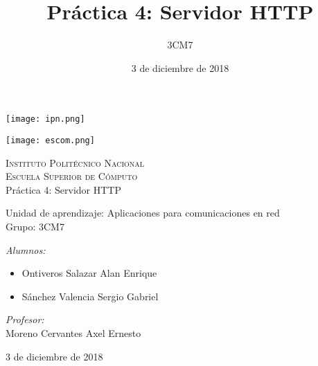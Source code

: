\documentclass[15pt]{article}
\title{Práctica 4: Servidor HTTP}
\author{3CM7}
\date{3 de diciembre de 2018}
\begin{document}
	
	\begin{titlepage}
		\begin{center}
			
			
			\noindent
			\begin{minipage}{0.5\textwidth}
				\begin{flushleft} \large
					\texttt{[image: ipn.png]}
				\end{flushleft}
			\end{minipage}%
			\begin{minipage}{0.55\textwidth}
				\begin{flushright} \large
					\texttt{[image: escom.png]}
				\end{flushright}
			\end{minipage}
			
			\textsc{\LARGE Instituto Politécnico Nacional}\\[0.5cm]
			
			\textsc{\Large Escuela Superior de Cómputo}\\[1cm]
			
			
			{ \huge Práctica 4: Servidor HTTP \\[1cm] }
			
			{ \Large Unidad de aprendizaje: Aplicaciones para comunicaciones en red} \\[1cm]
			
			{ \Large Grupo: 3CM7 } \\[1cm]
			
			\noindent
			\begin{minipage}{0.5\textwidth}
				\begin{flushleft} \large
					\emph{Alumnos:}\\
					\begin{itemize}\setlength\itemsep{0em}
						\item Ontiveros Salazar Alan Enrique
						\item Sánchez Valencia Sergio Gabriel
					\end{itemize}
				\end{flushleft}
			\end{minipage}%
			\begin{minipage}{0.5\textwidth}
				\begin{flushright} \large
					\emph{Profesor:} \\
					Moreno Cervantes Axel Ernesto
				\end{flushright}
			\end{minipage}
			
			\vfill
			
			{\large 3 de diciembre de 2018}
		\end{center}
	\end{titlepage}
\end{document}
